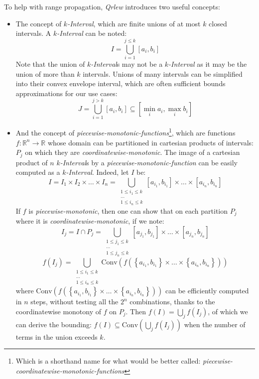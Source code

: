 \documentclass{article}
\newcommand{\qrlew}{\emph{Qrlew}}
\begin{document}
    To help with range propagation, \qrlew{} introduces two useful concepts:
    \begin{itemize}
        \item The concept of \emph{$k$-Interval}, which are finite unions of at most $k$ closed intervals. A \emph{$k$-Interval} can be noted:
        $$I = \bigcup_{i=1}^{j\leq k}\left[a_i, b_i\right]$$
        Note that the union of \emph{$k$-Interval}s may not be a \emph{$k$-Interval} as it may be the union of more than $k$ intervals.
        Unions of many intervals can be simplified into their convex envelope interval, which are often sufficient bounds approximations for our use cases:
        $$J = \bigcup_{i=1}^{j> k}\left[a_i, b_i\right] \subseteq \left[\min_i a_i, \max_i b_i\right]$$
        \item And the concept of \emph{piecewise-monotonic-functions}\footnote{Which is a shorthand name for what would be better called: \emph{piecewise-coordinatewise-monotonic-functions}}, which are functions $f: \mathbb{R}^n \rightarrow \mathbb{R}$ whose domain can be partitioned in cartesian products of intervals: $P_j$ on which they are \emph{coordinatewise-monotonic}.
        The image of a cartesian product of $n$ \emph{$k$-Interval}s by a \emph{piecewise-monotonic-function} can be easily computed as a \emph{$k$-Interval}.
        Indeed, let $I$ be:
        $$I = I_1\times I_2\times \ldots \times I_n = \bigcup_{\substack{1\leq i_1\leq k\\\ldots\\1\leq i_n\leq k}}\left[a_{i_1}, b_{i_1}\right]\times \ldots \times \left[a_{i_n}, b_{i_n}\right]$$
        If $f$ is \emph{piecewise-monotonic}, then one can show that on each partition $P_j$ where it is \emph{coordinatewise-monotonic}, if we note:
        $$I_j = I \cap P_j = \bigcup_{\substack{1\leq j_1\leq k\\\ldots\\1\leq j_n\leq k}}\left[a_{j_1}, b_{j_1}\right]\times \ldots \times \left[a_{j_n}, b_{j_n}\right]$$
        $$f(I_j) = \bigcup_{\substack{1\leq i_1\leq k\\\ldots\\1\leq i_n\leq k}}\text{Conv}\left(f\left( \left\{a_{i_1}, b_{i_1}\right\}\times \ldots \times \left\{a_{i_n}, b_{i_n}\right\}\right)\right)$$
        where $\text{Conv}\left(f\left( \left\{a_{i_1}, b_{i_1}\right\}\times \ldots \times \left\{a_{i_n}, b_{i_n}\right\}\right)\right)$ can be efficiently computed in $n$ steps, without testing all the $2^n$ combinations, thanks to the coordinatewise monotony of $f$ on $P_j$.
        Then $f(I) = \bigcup_j f(I_j)$, of which we can derive the bounding: $f(I) \subseteq \text{Conv}\left(\bigcup_j f(I_j)\right)$ when the number of terms in the union exceeds $k$.
    \end{itemize}
    
\end{document}
